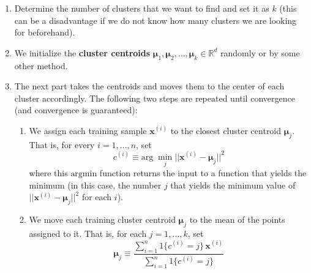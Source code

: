 \documentclass{article}
\begin{document}
    \begin{enumerate}
      \item Determine the number of clusters that we want to find and set it as $k$ (this can be a disadvantage if we do not know how many clusters we are looking for beforehand).

      \item We initialize the \textbf{cluster centroids} $\boldsymbol{\mu}_1, \boldsymbol{\mu}_2, \ldots, \boldsymbol{\mu}_k \in \mathbb{R}^d$ randomly or by some other method.

      \item The next part takes the centroids and moves them to the center of each cluster accordingly. The following two steps are repeated until convergence (and convergence is guaranteed):
        \begin{enumerate}
          \item We assign each training sample $\mathbf{x}^{(i)}$ to the closest cluster centroid $\boldsymbol{\mu}_j$. That is, for every $i = 1, \ldots, n$, set
            \begin{equation}
              c^{(i)} \equiv \text{arg}\; \min_j || \mathbf{x}^{(i)} - \boldsymbol{\mu}_j ||^2
            \end{equation}
          where this $\text{argmin}$ function returns the input to a function that yields the minimum (in this case, the number $j$ that yields the minimum value of $|| \mathbf{x}^{(i)} - \boldsymbol{\mu}_j ||^2$ for each $i$).

          \item We move each training cluster centroid $\boldsymbol{\mu}_j$ to the mean of the points assigned to it. That is, for each $j = 1, \ldots, k$, set 
            \begin{equation}
              \boldsymbol{\mu}_j \equiv \frac{\sum_{i=1}^n 1\{c^{(i)} = j\}\, \mathbf{x}^{(i)}}{\sum_{i=1}^n 1 \{c^{(i)} = j\}}
            \end{equation}
        \end{enumerate}
    \end{enumerate}
\end{document}
